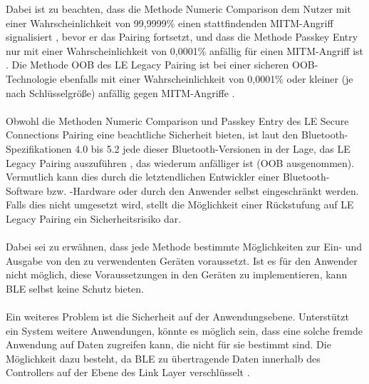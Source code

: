 Dabei ist zu beachten, dass die Methode Numeric Comparison dem Nutzer mit einer Wahrscheinlichkeit von 99,9999\% einen stattfindenden MITM-Angriff signalisiert \cite{BtSpec4.2_2309}, bevor er das Pairing fortsetzt, und dass die Methode Passkey Entry nur mit einer Wahrscheinlichkeit von 0,0001\% anfällig für einen MITM-Angriff ist \cite{BtSpec4.2_2304} \cite{BtSpec4.2_2311}. Die Methode OOB des LE Legacy Pairing ist bei einer sicheren OOB-Technologie ebenfalls mit einer Wahrscheinlichkeit von 0,0001\% oder kleiner (je nach Schlüsselgröße) anfällig gegen MITM-Angriffe \cite{BtSpec4.2_2305}.
\\\\
Obwohl die Methoden Numeric Comparison und Passkey Entry des LE Secure Connections Pairing eine beachtliche Sicherheit bieten, ist laut den Bluetooth-Spezifikationen 4.0 bis 5.2 jede dieser Bluetooth-Versionen in der Lage, das LE Legacy Pairing auszuführen \cite{BtSpec4.2_248_b} \cite{BtSpec5.2_277}, das wiederum anfälliger ist (OOB ausgenommen). 
Vermutlich kann dies durch die letztendlichen Entwickler einer Bluetooth-Software bzw. -Hardware oder durch den Anwender selbst eingeschränkt werden. Falls dies nicht umgesetzt wird, stellt die Möglichkeit einer Rückstufung auf LE Legacy Pairing ein Sicherheitsrisiko dar.
\\\\
Dabei sei zu erwähnen, dass jede Methode bestimmte Möglichkeiten zur Ein- und Ausgabe von den zu verwendenten Geräten voraussetzt. Ist es für den Anwender nicht möglich, diese Voraussetzungen in den Geräten zu implementieren, kann BLE selbst keine Schutz bieten.
\\\\
Ein weiteres Problem ist die Sicherheit auf der Anwendungsebene. Unterstützt ein System weitere Anwendungen, könnte es möglich sein, dass eine solche fremde Anwendung auf Daten zugreifen kann, die nicht für sie bestimmt sind. Die Möglichkeit dazu besteht, da BLE zu übertragende Daten innerhalb des Controllers auf der Ebene des Link Layer verschlüsselt \cite{BtSpec4.0_196} \cite{BtSpec4.0_2285}. 

